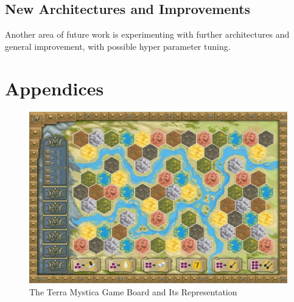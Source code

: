 \documentclass[10pt,twocolumn,letterpaper]{article}
\begin{document}
\subsection{New Architectures and Improvements} 
Another area of future work is experimenting with further architectures and general improvement, with possible hyper parameter tuning.


\section{Appendices}


\begin{figure}[!ht]
    \centering
    \includegraphics[scale=0.2]{figures/tm_board}
    \caption{The Terra Mystica Game Board and Its Representation}
    \label{fig:TM_Board}
\end{figure}
\end{document}
